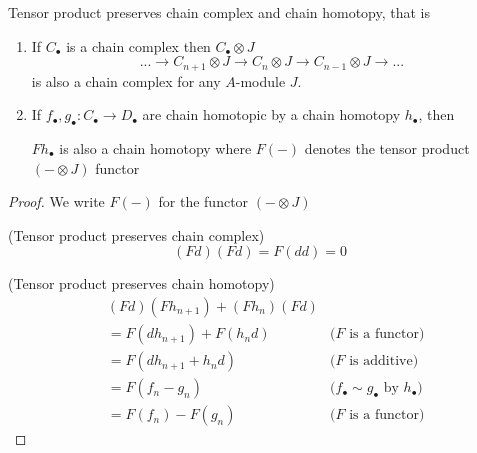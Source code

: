 \begin{lemma}
	\label{lemma6}
	Tensor product preserves chain complex and chain homotopy, that is
	\begin{enumerate}
		\item If $C_\bullet$ is a chain complex then $C_\bullet \otimes J$
		$$
		... \to C_{n+1} \otimes J \to C_n \otimes J \to C_{n-1} \otimes J \to ...
		$$
		is also a chain complex for any $A$-module $J$. 
		\item If $f_\bullet, g_\bullet: C_\bullet \to D_\bullet$ are chain homotopic by a chain homotopy $h_\bullet$, then 
		\begin{center}
		\end{center}
		
		$F h_\bullet$ is also a chain homotopy where $F(-)$ denotes the tensor product $(- \otimes J)$ functor
	\end{enumerate} 
\end{lemma}

\begin{proof}
	We write $F(-)$ for the functor $(- \otimes J)$
	
	(Tensor product preserves chain complex) 
	$$
		(Fd)(Fd) = F(dd) = 0
	$$
	
	(Tensor product preserves chain homotopy) 
	\begin{align*}
		&(F d) (F h_{n+1}) + (F h_n) (F d) \\
		&= F(d h_{n+1}) + F(h_n d) &\text{($F$ is a functor)} \\
		&= F(d h_{n+1} + h_n d) &\text{($F$ is additive)} \\
		&= F(f_n - g_n) &\text{($f_\bullet \sim g_\bullet$ by $h_\bullet$)} \\
		&= F(f_n) - F(g_n) &\text{($F$ is a functor)}
	\end{align*}
	
\end{proof}

